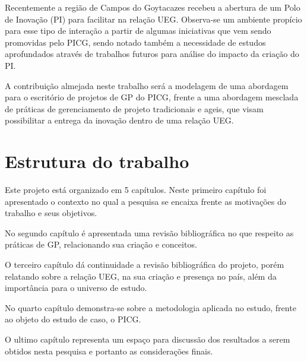 Recentemente a região de Campos do Goytacazes recebeu a abertura de um Polo de Inovação (PI) para facilitar na relação UEG. Observa-se um ambiente propício para esse tipo de interação a partir de algumas iniciativas que vem sendo promovidas pelo PICG, sendo notado também a necessidade de estudos aprofundados através de trabalhos futuros para análise do impacto da criação do PI.

A contribuição almejada neste trabalho será a modelagem de uma abordagem para o escritório de projetos de GP do PICG, frente a uma abordagem mesclada de práticas de gerenciamento de projeto tradicionais e ageis, que visam possibilitar a entrega da inovação dentro de uma relação UEG.


\section{Estrutura do trabalho}

Este projeto está organizado em 5 capítulos. Neste primeiro capítulo foi apresentado o contexto no qual a pesquisa se encaixa frente as motivações do trabalho e seus objetivos.

No segundo capítulo é apresentada uma revisão bibliográfica no que respeito as práticas de GP, relacionando sua criação e conceitos.

O terceiro capítulo dá continuidade a revisão bibliográfica do projeto, porém relatando sobre a relação UEG, na sua criação e presença no país, além da importância para o universo de estudo.

No quarto capítulo demonstra-se sobre a metodologia aplicada no estudo, frente ao objeto do estudo de caso, o PICG.

O ultimo capítulo representa um espaço para discussão dos resultados a serem obtidos nesta pesquisa e portanto as considerações finais.

